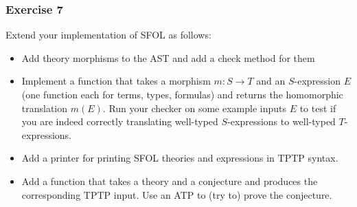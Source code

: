 \begin{frame}\frametitle{Exercise 7}
Extend your implementation of SFOL as follows:
\begin{itemize}
\item Add theory morphisms to the AST and add a check method for them
\item Implement a function that takes a morphism $m:S\to T$ and an $S$-expression $E$ (one function each for terms, types, formulas) and returns the homomorphic translation $m(E)$.
Run your checker on some example inputs $E$ to test if you are indeed correctly translating well-typed $S$-expressions to well-typed $T$-expressions.
\item Add a printer for printing SFOL theories and expressions in TPTP syntax.
\item Add a function that takes a theory and a conjecture and produces the corresponding TPTP input. Use an ATP to (try to) prove the conjecture.
\end{itemize}
\end{frame}
